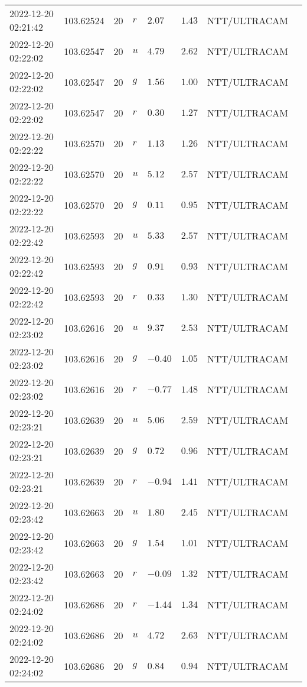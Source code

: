 \documentclass{nature_plusfigure}
\begin{document}
\begin{supplement}
\begin{center}
\begin{longtable}{llllllll}
2022-12-20 02:21:42 & 103.62524 & 20 & $r$ & $2.07$ & $1.43$ & NTT/ULTRACAM &  \\ 
2022-12-20 02:22:02 & 103.62547 & 20 & $u$ & $4.79$ & $2.62$ & NTT/ULTRACAM &  \\ 
2022-12-20 02:22:02 & 103.62547 & 20 & $g$ & $1.56$ & $1.00$ & NTT/ULTRACAM &  \\ 
2022-12-20 02:22:02 & 103.62547 & 20 & $r$ & $0.30$ & $1.27$ & NTT/ULTRACAM &  \\ 
2022-12-20 02:22:22 & 103.62570 & 20 & $r$ & $1.13$ & $1.26$ & NTT/ULTRACAM &  \\ 
2022-12-20 02:22:22 & 103.62570 & 20 & $u$ & $5.12$ & $2.57$ & NTT/ULTRACAM &  \\ 
2022-12-20 02:22:22 & 103.62570 & 20 & $g$ & $0.11$ & $0.95$ & NTT/ULTRACAM &  \\ 
2022-12-20 02:22:42 & 103.62593 & 20 & $u$ & $5.33$ & $2.57$ & NTT/ULTRACAM &  \\ 
2022-12-20 02:22:42 & 103.62593 & 20 & $g$ & $0.91$ & $0.93$ & NTT/ULTRACAM &  \\ 
2022-12-20 02:22:42 & 103.62593 & 20 & $r$ & $0.33$ & $1.30$ & NTT/ULTRACAM &  \\ 
2022-12-20 02:23:02 & 103.62616 & 20 & $u$ & $9.37$ & $2.53$ & NTT/ULTRACAM &  \\ 
2022-12-20 02:23:02 & 103.62616 & 20 & $g$ & $-0.40$ & $1.05$ & NTT/ULTRACAM &  \\ 
2022-12-20 02:23:02 & 103.62616 & 20 & $r$ & $-0.77$ & $1.48$ & NTT/ULTRACAM &  \\ 
2022-12-20 02:23:21 & 103.62639 & 20 & $u$ & $5.06$ & $2.59$ & NTT/ULTRACAM &  \\ 
2022-12-20 02:23:21 & 103.62639 & 20 & $g$ & $0.72$ & $0.96$ & NTT/ULTRACAM &  \\ 
2022-12-20 02:23:21 & 103.62639 & 20 & $r$ & $-0.94$ & $1.41$ & NTT/ULTRACAM &  \\ 
2022-12-20 02:23:42 & 103.62663 & 20 & $u$ & $1.80$ & $2.45$ & NTT/ULTRACAM &  \\ 
2022-12-20 02:23:42 & 103.62663 & 20 & $g$ & $1.54$ & $1.01$ & NTT/ULTRACAM &  \\ 
2022-12-20 02:23:42 & 103.62663 & 20 & $r$ & $-0.09$ & $1.32$ & NTT/ULTRACAM &  \\ 
2022-12-20 02:24:02 & 103.62686 & 20 & $r$ & $-1.44$ & $1.34$ & NTT/ULTRACAM &  \\ 
2022-12-20 02:24:02 & 103.62686 & 20 & $u$ & $4.72$ & $2.63$ & NTT/ULTRACAM &  \\ 
2022-12-20 02:24:02 & 103.62686 & 20 & $g$ & $0.84$ & $0.94$ & NTT/ULTRACAM &  \\ 

\end{longtable}
\end{center}
\end{supplement}
\end{document}
